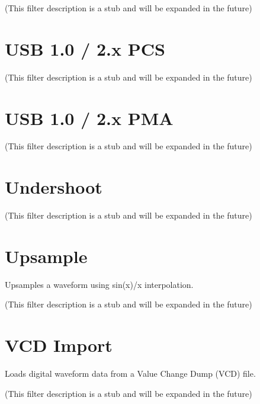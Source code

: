 (This filter description is a stub and will be expanded in the future)

\pagebreak
\section{USB 1.0 / 2.x PCS}

(This filter description is a stub and will be expanded in the future)

\pagebreak
\section{USB 1.0 / 2.x PMA}

(This filter description is a stub and will be expanded in the future)

\pagebreak
\section{Undershoot}

(This filter description is a stub and will be expanded in the future)

\pagebreak
\section{Upsample}

Upsamples a waveform using sin(x)/x interpolation.

(This filter description is a stub and will be expanded in the future)

\pagebreak
\section{VCD Import}

Loads digital waveform data from a Value Change Dump (VCD) file.

(This filter description is a stub and will be expanded in the future)

